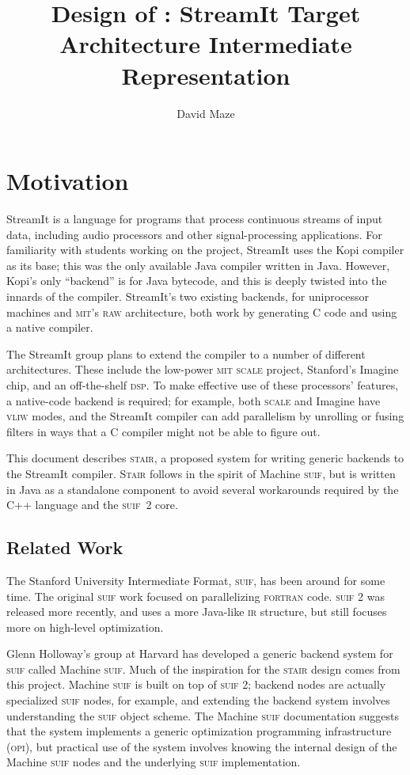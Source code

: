 \documentclass[11pt]{article}
\title{Design of \Stair: StreamIt Target Architecture Intermediate
  Representation}
\author{David Maze\\\dmazemail}
\def\dsp{\textsc{dsp}}
\def\fortran{\textsc{fortran}}
\def\ir{\textsc{ir}}
\def\mit{\textsc{mit}}
\def\opi{\textsc{opi}}
\def\raw{\textsc{raw}}
\def\scale{\textsc{scale}}
\def\stair{\textsc{stair}}
\def\Stair{\textsc{Stair}}
\def\streamit{Stream\-It}
\def\suif{\textsc{suif}}
\def\vliw{\textsc{vliw}}
\def\machsuif{Machine \suif}
\begin{document}
\maketitle
\tableofcontents

\section{Motivation}

\streamit{} is a language for programs that process continuous streams
of input data, including audio processors and other signal-processing
applications.  For familiarity with students working on the project,
\streamit{} uses the Kopi compiler\cite{kopi} as its base; this was
the only available Java compiler written in Java.  However, Kopi's
only ``backend'' is for Java bytecode, and this is deeply twisted into
the innards of the compiler.  \streamit's two existing backends, for
uniprocessor machines and \mit's \raw{} architecture, both work by
generating C code and using a native compiler.

The \streamit{} group plans to extend the compiler to a number of
different architectures.  These include the low-power \mit{} \scale{}
project, Stanford's Imagine chip, and an off-the-shelf \dsp.  To make
effective use of these processors' features, a native-code backend is
required; for example, both \scale{} and Imagine have \vliw{} modes,
and the \streamit{} compiler can add parallelism by unrolling or fusing
filters in ways that a C compiler might not be able to figure out.

This document describes \stair, a proposed system for writing generic
backends to the \streamit{} compiler.  \Stair{} follows in the spirit
of \machsuif\cite{machsuif}, but is written in Java as a standalone
component to avoid several workarounds required by the C++ language
and the \suif~2 core.

\subsection{Related Work}

The Stanford University Intermediate Format, \suif\cite{suif,suif2},
has been around for some time.  The original \suif{} work focused on
parallelizing \fortran{} code.  \suif{} 2 was released more recently,
and uses a more Java-like \ir{} structure, but still focuses more on
high-level optimization.

Glenn Holloway's group at Harvard has developed a generic backend
system for \suif{} called \machsuif\cite{machsuif}.  Much of the
inspiration for the \stair{} design comes from this project.
\machsuif{} is built on top of \suif{} 2; backend nodes are actually
specialized \suif{} nodes, for example, and extending the backend
system involves understanding the \suif{} object scheme.  The
\machsuif{} documentation suggests that the system implements a
generic optimization programming infrastructure (\opi), but practical
use of the system involves knowing the internal design of the
\machsuif{} nodes and the underlying \suif{} implementation.
\end{document}

